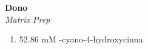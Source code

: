 \textbf{Dono} 
\\
\textit{Matrix Prep}
\begin{enumerate}
\item{52.86 mM \alpha-cyano-4-hydroxycinna}
\end{enumerate}
